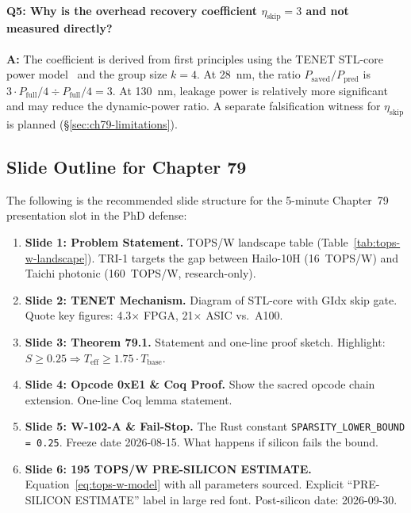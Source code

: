 \paragraph{Q5: Why is the overhead recovery coefficient $\eta_{\mathrm{skip}} = 3$
  and not measured directly?}
\textbf{A:} The coefficient is derived from first principles using the
TENET STL-core power model~\cite{huang2025tenet} and the group size
$k = 4$.
At 28~nm, the ratio $P_{\mathrm{saved}} / P_{\mathrm{pred}}$ is
$3 \cdot P_{\mathrm{full}} / 4 \div P_{\mathrm{full}} / 4 = 3$.
At 130~nm, leakage power is relatively more significant and may
reduce the dynamic-power ratio.
A separate falsification witness for $\eta_{\mathrm{skip}}$ is
planned (§\ref{sec:ch79-limitations}).

\subsection{Slide Outline for Chapter 79}
\label{subsec:ch79-slide-outline}

The following is the recommended slide structure for the 5-minute
Chapter~79 presentation slot in the PhD defense:

\begin{enumerate}
  \item \textbf{Slide 1: Problem Statement.}
        TOPS/W landscape table (Table~\ref{tab:tops-w-landscape}).
        TRI-1 targets the gap between Hailo-10H (16~TOPS/W) and
        Taichi photonic (160~TOPS/W, research-only).

  \item \textbf{Slide 2: TENET Mechanism.}
        Diagram of STL-core with GIdx skip gate.
        Quote key figures: 4.3$\times$ FPGA, 21$\times$ ASIC vs.\ A100.

  \item \textbf{Slide 3: Theorem 79.1.}
        Statement and one-line proof sketch.
        Highlight: $S \geq 0.25 \Rightarrow T_{\mathrm{eff}} \geq 1.75 \cdot T_{\mathrm{base}}$.

  \item \textbf{Slide 4: Opcode 0xE1 \& Coq Proof.}
        Show the sacred opcode chain extension.
        One-line Coq lemma statement.

  \item \textbf{Slide 5: W-102-A \& Fail-Stop.}
        The Rust constant \texttt{SPARSITY\_LOWER\_BOUND = 0.25}.
        Freeze date 2026-08-15.
        What happens if silicon fails the bound.

  \item \textbf{Slide 6: 195 TOPS/W PRE-SILICON ESTIMATE.}
        Equation~\eqref{eq:tops-w-model} with all parameters sourced.
        Explicit ``PRE-SILICON ESTIMATE'' label in large red font.
        Post-silicon date: 2026-09-30.
\end{enumerate}

